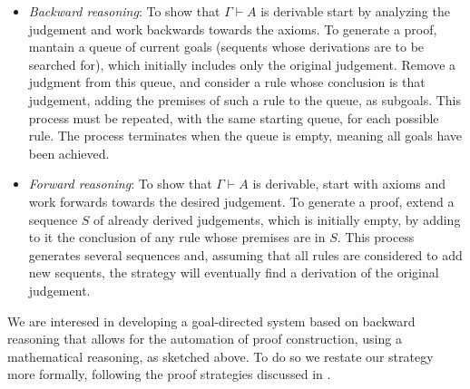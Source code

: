 \documentclass[a4paper,UKenglish]{lipics}
\newcommand{\G}{\Gamma}
\begin{document}
\begin{itemize}
\item {\em Backward reasoning}: To show that $\G\vdash A$ is derivable start by analyzing the judgement and work backwards towards the axioms. To generate a proof, mantain a queue of current goals (sequents whose derivations are to be searched for), which initially includes only the original judgement. Remove a judgment from this queue, and consider a rule whose conclusion is that judgement, adding the premises of such a rule to the queue, as subgoals. This process must be repeated, with the same starting queue, for each possible rule.  The process terminates when the queue is empty, meaning all goals have been achieved.
\item {\em Forward reasoning}: To show that $\G\vdash A$ is derivable, start with axioms and work forwards towards the desired judgement. To generate a proof, extend a sequence $S$ of already derived judgements, which is initially empty, by adding to it the conclusion of any rule whose premises are in $S$.  This process generates several sequences and, assuming that all rules are considered to add new sequents, the strategy will eventually find a derivation of the original judgement. 
\end{itemize}

\noindent We are interesed in developing a goal-directed system based on backward reasoning that allows for the automation of proof construction, using a mathematical reasoning, as sketched above. To do so we restate our strategy more formally, following the proof strategies discussed in \cite{mh}.
\end{document}
